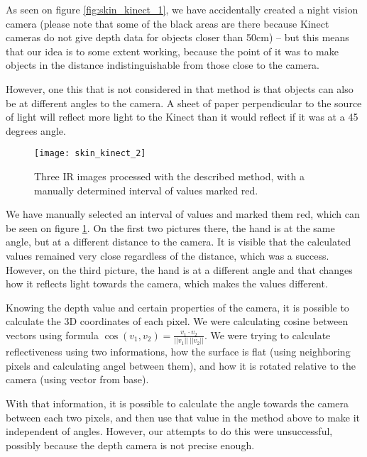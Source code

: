             As seen on figure \ref{fig:skin_kinect_1}, we have accidentally created
            a night vision camera (please note that some of the black areas are there because Kinect cameras do not give depth data for objects closer than 50cm)
            -- but this means that our idea is to some extent working, because the point
            of it was to make objects in the distance indistinguishable from those close
            to the camera.

            However, one this that is not considered in that method is that objects
            can also be at different angles to the camera.
            A sheet of paper perpendicular to the source of light will reflect more
            light to the Kinect than it would reflect if it was at a 45 degrees angle.

            \begin{figure}[H]
                \caption{Three IR images processed with the described method, with a
                manually determined interval of values marked red.}
                \centering
                \texttt{[image: skin\_kinect\_2]}
                \label{fig:skin_kinect_2}
            \end{figure}

            We have manually selected an interval of values and marked them red, which
            can be seen on figure \ref{fig:skin_kinect_2}.
            On the first two pictures there, the hand is at the same angle, but at a
            different distance to the camera.
            It is visible that the calculated values remained very close regardless
            of the distance, which was a success.
            However, on the third picture, the hand is at a different angle and
            that changes how it reflects light towards the camera, which makes the values
            different.

            Knowing the depth value and certain properties of the camera, it is possible
            to calculate the 3D coordinates of each pixel.
            We were calculating cosine between vectors using formula
            $\cos(v_1, v_2) = \frac{v_1 \cdot v_2}{||v_1||~||v_2||}$.
            We were trying to calculate reflectiveness using two informations,
            how the surface is flat (using neighboring pixels and calculating angel between them),
            and how it is rotated relative to the camera (using vector from base).

            With that information, it is possible to calculate the angle towards the
            camera between each two pixels, and then use that value in the method above
            to make it independent of angles.
            However, our attempts to do this were unsuccessful, possibly because the
            depth camera is not precise enough.

